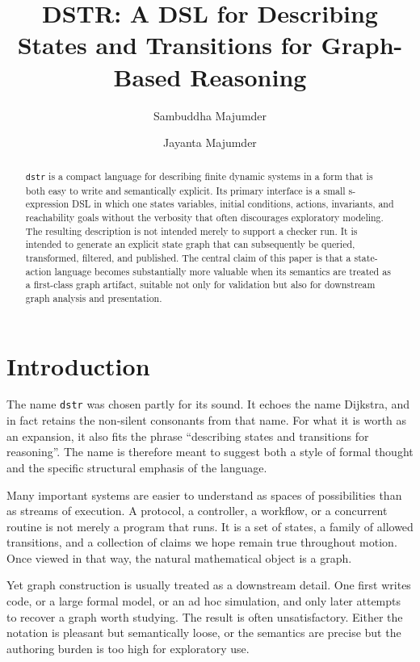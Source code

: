 \documentclass[11pt]{article}
\title{DSTR: A DSL for Describing States and Transitions for Graph-Based Reasoning}
\author{Sambuddha Majumder \and Jayanta Majumder}
\date{}
\begin{document}
\maketitle

\begin{abstract}
\texttt{dstr} is a compact language for describing finite dynamic systems in a
form that is both easy to write and semantically explicit. Its primary
interface is a small s-expression DSL in which one states variables, initial
conditions, actions, invariants, and reachability goals without the verbosity
that often discourages exploratory modeling. The resulting description is not
intended merely to support a checker run. It is intended to generate an
explicit state graph that can subsequently be queried, transformed, filtered,
and published. The central claim of this paper is that a state-action language
becomes substantially more valuable when its semantics are treated as a
first-class graph artifact, suitable not only for validation but also for
downstream graph analysis and presentation.
\end{abstract}

\section{Introduction}

The name \texttt{dstr} was chosen partly for its sound. It echoes the name
Dijkstra, and in fact retains the non-silent consonants from that name. For
what it is worth as an expansion, it also fits the phrase ``describing states
and transitions for reasoning''. The name is therefore meant to suggest both a
style of formal thought and the specific structural emphasis of the language.

Many important systems are easier to understand as spaces of possibilities than
as streams of execution. A protocol, a controller, a workflow, or a concurrent
routine is not merely a program that runs. It is a set of states, a family of
allowed transitions, and a collection of claims we hope remain true throughout
motion. Once viewed in that way, the natural mathematical object is a graph.

Yet graph construction is usually treated as a downstream detail. One first
writes code, or a large formal model, or an ad hoc simulation, and only later
attempts to recover a graph worth studying. The result is often unsatisfactory.
Either the notation is pleasant but semantically loose, or the semantics are
precise but the authoring burden is too high for exploratory use.
\end{document}
